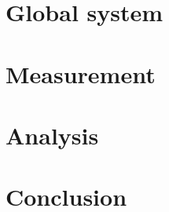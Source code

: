 \documentclass[
    iai, %
    mi, %
]{heig-tb}
\begin{document}
\chapter{Global system}


\chapter{Measurement}


\chapter{Analysis}


\chapter{Conclusion}


\clearpage
\printbibliography

\label{glossaire}
\printnoidxglossary
\label{index}
\printindex

\appendix
\appendixpage
\addappheadtotoc



% 
\end{document}
